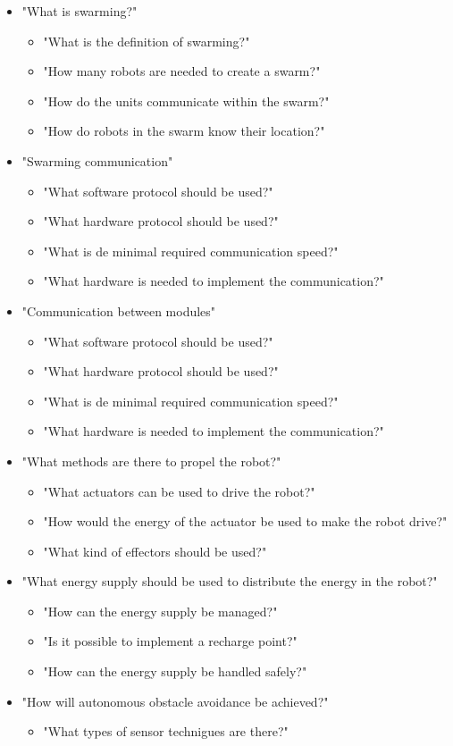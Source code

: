 \documentclass[10pt,a4paper]{article}
\begin{document}
\begin{itemize}
    \item "What is swarming?"
    \begin{itemize}
        \item "What is the definition of swarming?"
        \item "How many robots are needed to create a swarm?"
        \item "How do the units communicate within the swarm?"
        \item "How do robots in the swarm know their location?"
    \end{itemize}    
    \item "Swarming communication"
    \begin{itemize}
        \item "What software protocol should be used?"
        \item "What hardware protocol should be used?"
        \item "What is de minimal required communication speed?"
        \item "What hardware is needed to implement the communication?"
    \end{itemize}
        \item "Communication between modules"
    \begin{itemize}
        \item "What software protocol should be used?"
        \item "What hardware protocol should be used?"
        \item "What is de minimal required communication speed?"
        \item "What hardware is needed to implement the communication?"
    \end{itemize}
    \item "What methods are there to propel the robot?"
    \begin{itemize}
        \item "What actuators can be used to drive the robot?"
        \item "How would the energy of the actuator be used to make the robot drive?"
        \item "What kind of effectors should be used?"
    \end{itemize}
    \item "What energy supply should be used to distribute the energy in the robot?"
    \begin{itemize}
        \item "How can the energy supply be managed?"
        \item "Is it possible to implement a recharge point?"
        \item "How can the energy supply be handled safely?"
    \end{itemize}
    \item "How will autonomous obstacle avoidance be achieved?"
    \begin{itemize}
   		 \item "What types of sensor technigues are there?"
    \end{itemize}
\end{itemize}
\newpage
\end{document}
